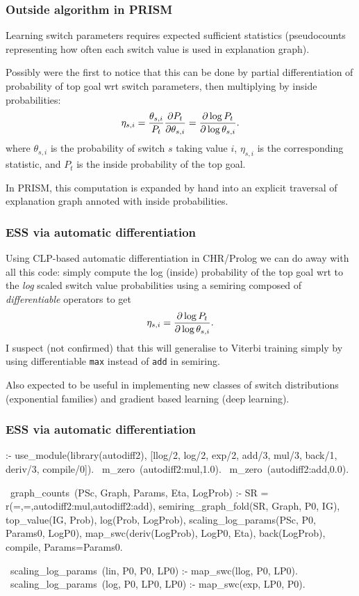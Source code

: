 \documentclass[usenames,dvipsnames]{beamer}
\newenvironment{isframe}[1][untitled]{\begin{frame}[fragile=singleslide,environment=isframe]\frametitle{#1}}{\end{frame}}
\def\pl#1{\lstinline[language={[SWI]Prolog},columns=fullflexible]{#1}}
\begin{document}
\begin{isframe}[Outside algorithm in PRISM]
	\def\sw#1{#1_{s,i}}
	Learning switch parameters requires expected sufficient statistics
	(pseudocounts representing how often each switch value is used in explanation graph).

	Possibly \citet{SatoKameya2001} were the first to notice that this can be done by partial differentiation of
	probability of top goal wrt switch parameters, then multiplying by inside probabilities:
  \begin{equation}
		\sw\eta = \frac{\sw\theta}{P_t} \pd{P_t}{\sw\theta} = \pd{\log P_t}{\log \sw\theta}.
  \end{equation}
	where $\sw\theta$ is the probability of switch $s$ taking value $i$,
	$\sw\eta$ is the corresponding statistic, and $P_t$ is the inside probability
	of the top goal.

	In PRISM, this computation is expanded by hand into an explicit traversal of explanation graph annoted
  with inside probabilities.
\end{isframe}

\begin{isframe}[ESS via automatic differentiation]
	\def\sw#1{#1_{s,i}}
	Using CLP-based automatic differentiation in CHR/Prolog \citep{Abdallah2017} we can
	do away with all this code: simply compute the log (inside) probability of the top
	goal wrt to the \emph{log} scaled switch value probabilities using a semiring
  composed of \emph{differentiable} operators to get
	\[
		\sw\eta = \pd{\log P_t}{\log \sw\theta}.
	\]
	I suspect (not confirmed) that this will generalise to Viterbi training simply by using
  differentiable \pl{max} instead of \pl{add} in semiring.

	Also expected to be useful in implementing new classes of switch distributions (\eg exponential
  families) and gradient based learning (\cf deep learning).
\end{isframe}

\begin{isframe}[ESS via automatic differentiation]
\begin{prolog}[xleftmargin=0em,basicstyle=\small]
	:- use_module(library(autodiff2),  [llog/2, log/2, exp/2, add/3, mul/3,
                                      back/1, deriv/3, compile/0]).
	~m_zero~(autodiff2:mul,1.0).
	~m_zero~(autodiff2:add,0.0).

	~graph_counts~(PSc, Graph, Params, Eta, LogProb) :-
		 SR = r(=,=,autodiff2:mul,autodiff2:add),
		 semiring_graph_fold(SR, Graph, P0, IG),
		 top_value(IG, Prob), log(Prob, LogProb),
		 scaling_log_params(PSc, P0, Params0, LogP0),
		 map_swc(deriv(LogProb), LogP0, Eta),
		 back(LogProb), compile, Params=Params0.

	~scaling_log_params~(lin, P0, P0,  LP0) :- map_swc(llog, P0, LP0).
	~scaling_log_params~(log, P0, LP0, LP0) :- map_swc(exp, LP0, P0).
\end{prolog}
\end{isframe}
\end{document}
